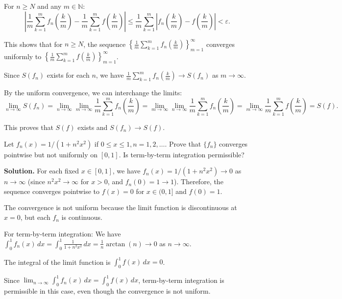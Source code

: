 For \( n \geq N \) and any \( m \in \mathbb{N} \):
\[\left|\frac{1}{m} \sum_{k=1}^m f_n \left( \frac{k}{m} \right) - \frac{1}{m} \sum_{k=1}^m f \left( \frac{k}{m} \right)\right| \leq \frac{1}{m} \sum_{k=1}^m \left|f_n \left( \frac{k}{m} \right) - f \left( \frac{k}{m} \right)\right| < \varepsilon.\]

This shows that for \( n \geq N \), the sequence \( \left\{\frac{1}{m} \sum_{k=1}^m f_n \left( \frac{k}{m} \right)\right\}_{m=1}^{\infty} \) converges uniformly to \( \left\{\frac{1}{m} \sum_{k=1}^m f \left( \frac{k}{m} \right)\right\}_{m=1}^{\infty} \).

Since \( S(f_n) \) exists for each \( n \), we have \( \frac{1}{m} \sum_{k=1}^m f_n \left( \frac{k}{m} \right) \to S(f_n) \) as \( m \to \infty \).

By the uniform convergence, we can interchange the limits:
\[\lim_{n \to \infty} S(f_n) = \lim_{n \to \infty} \lim_{m \to \infty} \frac{1}{m} \sum_{k=1}^m f_n \left( \frac{k}{m} \right) = \lim_{m \to \infty} \lim_{n \to \infty} \frac{1}{m} \sum_{k=1}^m f_n \left( \frac{k}{m} \right) = \lim_{m \to \infty} \frac{1}{m} \sum_{k=1}^m f \left( \frac{k}{m} \right) = S(f).\]

This proves that \( S(f) \) exists and \( S(f_n) \to S(f) \).

\begin{problembox}
Let \( f_n(x) = 1/(1 + n^2x^2) \) if \( 0 \leq x \leq 1, n = 1, 2, \ldots \). Prove that \(\{f_n\}\) converges pointwise but not uniformly on \([0, 1]\). Is term-by-term integration permissible?
\end{problembox}

\noindent\textbf{Solution.} For each fixed \( x \in [0, 1] \), we have \( f_n(x) = 1/(1 + n^2x^2) \to 0 \) as \( n \to \infty \) (since \( n^2x^2 \to \infty \) for \( x > 0 \), and \( f_n(0) = 1 \to 1 \)). Therefore, the sequence converges pointwise to \( f(x) = 0 \) for \( x \in (0, 1] \) and \( f(0) = 1 \).

The convergence is not uniform because the limit function is discontinuous at \( x = 0 \), but each \( f_n \) is continuous.

For term-by-term integration: We have \( \int_0^1 f_n(x) \, dx = \int_0^1 \frac{1}{1 + n^2x^2} \, dx = \frac{1}{n} \arctan(n) \to 0 \) as \( n \to \infty \).

The integral of the limit function is \( \int_0^1 f(x) \, dx = 0 \).

Since \( \lim_{n \to \infty} \int_0^1 f_n(x) \, dx = \int_0^1 f(x) \, dx \), term-by-term integration is permissible in this case, even though the convergence is not uniform.

